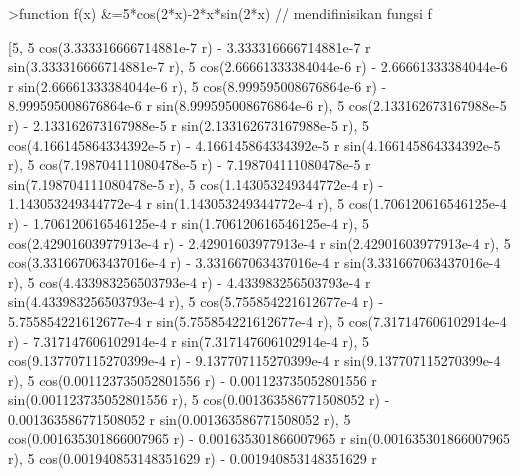 \documentclass[a4paper,10pt]{article}
\begin{document}
\begin{eulernotebook}
\begin{eulercomment}
\begin{eulercomment}
\begin{eulercomment}
\begin{eulercomment}
\begin{eulercomment}
\begin{eulercomment}
\begin{eulercomment}
\begin{eulercomment}
\begin{eulercomment}
\begin{eulercomment}
\begin{eulercomment}
\begin{eulercomment}
\begin{eulercomment}
\begin{eulercomment}
\begin{eulercomment}
\begin{eulercomment}
\begin{eulercomment}
\begin{eulercomment}
\begin{eulercomment}
\begin{eulercomment}
\begin{eulercomment}
\begin{eulercomment}
\begin{eulercomment}
\begin{eulercomment}
\begin{eulercomment}
\begin{eulercomment}
\begin{eulercomment}
\begin{eulercomment}
\begin{eulerprompt}
>function f(x) &=5*cos(2*x)-2*x*sin(2*x) // mendifinisikan fungsi f
\end{eulerprompt}
\begin{euleroutput}
  
          [5, 5 cos(3.333316666714881e-7 r)
   - 3.333316666714881e-7 r sin(3.333316666714881e-7 r), 
  5 cos(2.66661333384044e-6 r) - 2.66661333384044e-6 r
   sin(2.66661333384044e-6 r), 5 cos(8.999595008676864e-6 r)
   - 8.999595008676864e-6 r sin(8.999595008676864e-6 r), 
  5 cos(2.133162673167988e-5 r) - 2.133162673167988e-5 r
   sin(2.133162673167988e-5 r), 5 cos(4.166145864334392e-5 r)
   - 4.166145864334392e-5 r sin(4.166145864334392e-5 r), 
  5 cos(7.198704111080478e-5 r) - 7.198704111080478e-5 r
   sin(7.198704111080478e-5 r), 5 cos(1.143053249344772e-4 r)
   - 1.143053249344772e-4 r sin(1.143053249344772e-4 r), 
  5 cos(1.706120616546125e-4 r) - 1.706120616546125e-4 r
   sin(1.706120616546125e-4 r), 5 cos(2.42901603977913e-4 r)
   - 2.42901603977913e-4 r sin(2.42901603977913e-4 r), 
  5 cos(3.331667063437016e-4 r) - 3.331667063437016e-4 r
   sin(3.331667063437016e-4 r), 5 cos(4.433983256503793e-4 r)
   - 4.433983256503793e-4 r sin(4.433983256503793e-4 r), 
  5 cos(5.755854221612677e-4 r) - 5.755854221612677e-4 r
   sin(5.755854221612677e-4 r), 5 cos(7.317147606102914e-4 r)
   - 7.317147606102914e-4 r sin(7.317147606102914e-4 r), 
  5 cos(9.137707115270399e-4 r) - 9.137707115270399e-4 r
   sin(9.137707115270399e-4 r), 5 cos(0.001123735052801556 r)
   - 0.001123735052801556 r sin(0.001123735052801556 r), 
  5 cos(0.001363586771508052 r) - 0.001363586771508052 r
   sin(0.001363586771508052 r), 5 cos(0.001635301866007965 r)
   - 0.001635301866007965 r sin(0.001635301866007965 r), 
  5 cos(0.001940853148351629 r) - 0.001940853148351629 r

\end{euleroutput}
\end{eulercomment}
\end{eulercomment}
\end{eulercomment}
\end{eulercomment}
\end{eulercomment}
\end{eulercomment}
\end{eulercomment}
\end{eulercomment}
\end{eulercomment}
\end{eulercomment}
\end{eulercomment}
\end{eulercomment}
\end{eulercomment}
\end{eulercomment}
\end{eulercomment}
\end{eulercomment}
\end{eulercomment}
\end{eulercomment}
\end{eulercomment}
\end{eulercomment}
\end{eulercomment}
\end{eulercomment}
\end{eulercomment}
\end{eulercomment}
\end{eulercomment}
\end{eulercomment}
\end{eulercomment}
\end{eulercomment}
\end{eulernotebook}
\end{document}
